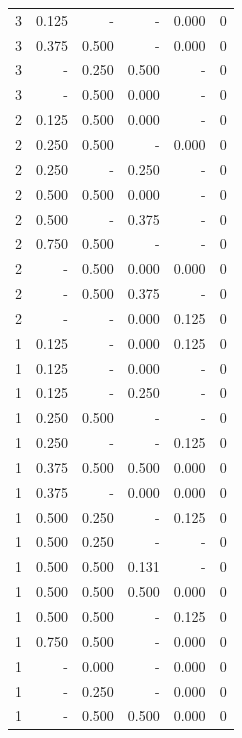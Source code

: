\documentclass[a4paper]{article}\usepackage{graphicx, color}
\begin{document}
\begin{table}[ht]
\begin{tabular}{rrrrrr}
   \rowcolor{nullColor} 3 & 0.125 & - & - & 0.000 & 0 \\ 
  3 & 0.375 & 0.500 & - & 0.000 & 0 \\ 
   \rowcolor{badColor} 3 & - & 0.250 & 0.500 & - & 0 \\ 
   \rowcolor{badColor} 3 & - & 0.500 & 0.000 & - & 0 \\ 
   \rowcolor{badColor} 2 & 0.125 & 0.500 & 0.000 & - & 0 \\ 
  2 & 0.250 & 0.500 & - & 0.000 & 0 \\ 
   \rowcolor{sosoColor} 2 & 0.250 & - & 0.250 & - & 0 \\ 
   \rowcolor{badColor} 2 & 0.500 & 0.500 & 0.000 & - & 0 \\ 
   \rowcolor{sosoColor} 2 & 0.500 & - & 0.375 & - & 0 \\ 
  2 & 0.750 & 0.500 & - & - & 0 \\ 
   \rowcolor{badColor} 2 & - & 0.500 & 0.000 & 0.000 & 0 \\ 
  2 & - & 0.500 & 0.375 & - & 0 \\ 
   \rowcolor{sosoColor} 2 & - & - & 0.000 & 0.125 & 0 \\ 
   \rowcolor{sosoColor} 1 & 0.125 & - & 0.000 & 0.125 & 0 \\ 
   \rowcolor{sosoColor} 1 & 0.125 & - & 0.000 & - & 0 \\ 
   \rowcolor{sosoColor} 1 & 0.125 & - & 0.250 & - & 0 \\ 
  1 & 0.250 & 0.500 & - & - & 0 \\ 
   \rowcolor{nullColor} 1 & 0.250 & - & - & 0.125 & 0 \\ 
   \rowcolor{goodColor} 1 & 0.375 & 0.500 & 0.500 & 0.000 & 0 \\ 
   \rowcolor{sosoColor} 1 & 0.375 & - & 0.000 & 0.000 & 0 \\ 
  1 & 0.500 & 0.250 & - & 0.125 & 0 \\ 
  1 & 0.500 & 0.250 & - & - & 0 \\ 
   \rowcolor{badColor} 1 & 0.500 & 0.500 & 0.131 & - & 0 \\ 
   \rowcolor{goodColor} 1 & 0.500 & 0.500 & 0.500 & 0.000 & 0 \\ 
  1 & 0.500 & 0.500 & - & 0.125 & 0 \\ 
  1 & 0.750 & 0.500 & - & 0.000 & 0 \\ 
  1 & - & 0.000 & - & 0.000 & 0 \\ 
  1 & - & 0.250 & - & 0.000 & 0 \\ 
   \rowcolor{goodColor} 1 & - & 0.500 & 0.500 & 0.000 & 0 \\ 

\end{tabular}
\end{table}
\end{document}
